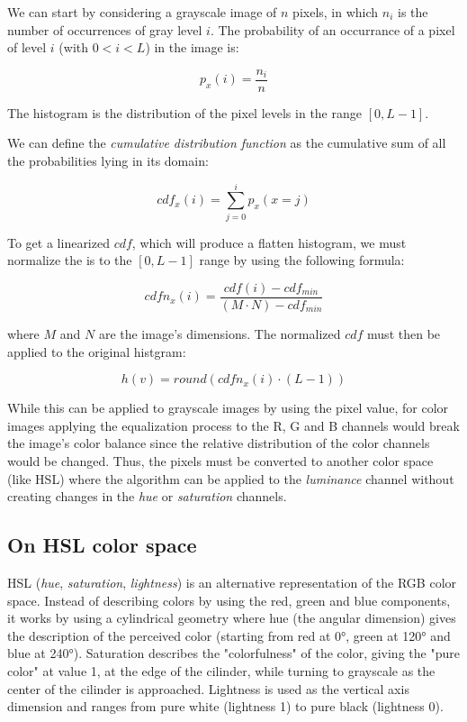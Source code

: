 \documentclass[10pt,twocolumn,letterpaper]{article}
\begin{document}
We can start by considering a grayscale image of \(n\) pixels, in which \(n_i\)
is the number of occurrences of gray level \(i\). The probability of an occurrance
of a pixel of level \(i\) (with \(0 < i < L\)) in the image is:

\[ p_x(i) = \frac{n_i}{n} \]

The histogram is the distribution of the pixel levels in the range \([0, L - 1]\).

We can define the \emph{cumulative distribution function} as the cumulative sum
of all the probabilities lying in its domain:

\[ cdf_x(i) = \sum_{j=0}^{i} p_x(x = j) \]

To get a linearized \(cdf\), which will produce a flatten histogram, we must
normalize the is to the \([0, L - 1]\) range by using the following formula:

\[ cdfn_x(i) = \frac{cdf(i) - cdf_{min}}{(M \cdot N) - cdf_{min}} \]

where \(M\) and \(N\) are the image's dimensions. The normalized \(cdf\) must
then be applied to the original histgram:

\[ h(v) = round(cdfn_x(i) \cdot (L - 1)) \]

While this can be applied to grayscale images by using the pixel value, for
color images applying the equalization process to the R, G and B channels would
break the image's color balance since the relative distribution of the color
channels would be changed. Thus, the pixels must be converted to another color
space (like HSL) where the algorithm can be applied to the \emph{luminance}
channel without creating changes in the \emph{hue} or \emph{saturation}
channels.

\subsection{On HSL color space}

HSL (\emph{hue}, \emph{saturation}, \emph{lightness}) is an alternative
representation of the RGB color space. Instead of describing colors by
using the red, green and blue components, it works by using a cylindrical
geometry where hue (the angular dimension) gives the description of the
perceived color (starting from red at 0°, green at 120° and blue at 240°).
Saturation describes the "colorfulness" of the color, giving the "pure color"
at value 1, at the edge of the cilinder, while turning to grayscale as the center
of the cilinder is approached. Lightness is used as the vertical axis dimension
and ranges from pure white (lightness 1) to pure black (lightness 0).
\end{document}
